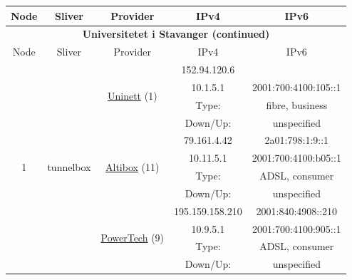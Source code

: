 \begin{small}
\begin{center}
\begin{longtable}{|c|c|c|c|c|c|c|c|}
 \multicolumn{2}{|p{8em}|}{Node} & \multicolumn{2}{|p{8em}|}{Sliver} & \multicolumn{2}{|p{8em}|}{Provider} & IPv4 & IPv6 \\ \hline
\endfirsthead
\hline
 \multicolumn{8}{|c|}{\textbf{Universitetet i Stavanger (continued)}} \\ \hline
 \multicolumn{2}{|p{8em}|}{Node} & \multicolumn{2}{|p{8em}|}{Sliver} & \multicolumn{2}{|p{8em}|}{Provider} & IPv4 & IPv6 \\ \hline
\endhead
 \multirow{12}{*}{\tiny{1}} & \multicolumn{3}{|c|}{\multirow{12}{*}{\tiny{tunnelbox}}} & \multicolumn{2}{|c|}{\multirow{4}{*}{\tiny{\href{https://www.uninett.no}{Uninett} (1)}}} & \tiny{152.94.120.6} & \frownie{} \\* \cline{7-7}\cline{8-8}
  & \multicolumn{3}{|c|}{} & \multicolumn{2}{|c|}{} & \tiny{10.1.5.1} & \tiny{2001:700:4100:105::1} \\* \cline{7-7}\cline{8-8}
  & \multicolumn{3}{|c|}{} & \multicolumn{2}{|c|}{} & Type: & fibre, business \\* \cline{7-7}\cline{8-8}
  & \multicolumn{3}{|c|}{} & \multicolumn{2}{|c|}{} & Down/Up:  & unspecified \\* \cline{5-5}\cline{6-6}\cline{7-7}\cline{8-8}
  & \multicolumn{3}{|c|}{} & \multicolumn{2}{|c|}{\multirow{4}{*}{\tiny{\href{https://www.altibox.no}{Altibox} (11)}}} & \tiny{79.161.4.42} & \tiny{2a01:798:1:9::1} \\* \cline{7-7}\cline{8-8}
  & \multicolumn{3}{|c|}{} & \multicolumn{2}{|c|}{} & \tiny{10.11.5.1} & \tiny{2001:700:4100:b05::1} \\* \cline{7-7}\cline{8-8}
  & \multicolumn{3}{|c|}{} & \multicolumn{2}{|c|}{} & Type: & ADSL, consumer \\* \cline{7-7}\cline{8-8}
  & \multicolumn{3}{|c|}{} & \multicolumn{2}{|c|}{} & Down/Up:  & unspecified \\* \cline{5-5}\cline{6-6}\cline{7-7}\cline{8-8}
  & \multicolumn{3}{|c|}{} & \multicolumn{2}{|c|}{\multirow{4}{*}{\tiny{\href{http://www.powertech.no}{PowerTech} (9)}}} & \tiny{195.159.158.210} & \tiny{2001:840:4908::210} \\* \cline{7-7}\cline{8-8}
  & \multicolumn{3}{|c|}{} & \multicolumn{2}{|c|}{} & \tiny{10.9.5.1} & \tiny{2001:700:4100:905::1} \\* \cline{7-7}\cline{8-8}
  & \multicolumn{3}{|c|}{} & \multicolumn{2}{|c|}{} & Type: & ADSL, consumer \\* \cline{7-7}\cline{8-8}
  & \multicolumn{3}{|c|}{} & \multicolumn{2}{|c|}{} & Down/Up:  & unspecified \\ \hline

\end{longtable}
\end{center}
\end{small}
